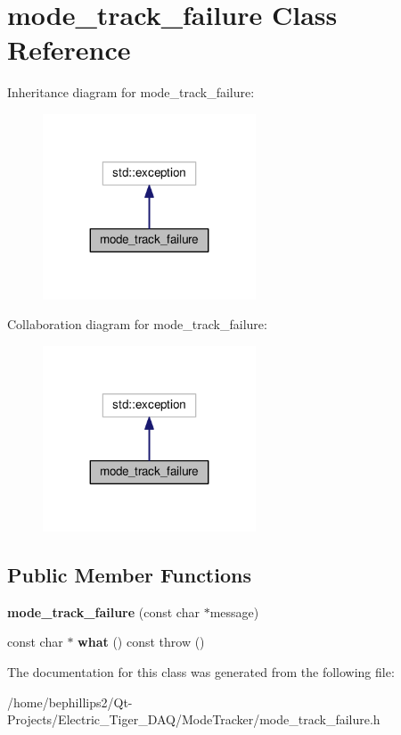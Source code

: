 \hypertarget{classmode__track__failure}{}\section{mode\+\_\+track\+\_\+failure Class Reference}
\label{classmode__track__failure}


Inheritance diagram for mode\+\_\+track\+\_\+failure\+:\nopagebreak
\begin{figure}[H]
\begin{center}
\leavevmode
\includegraphics[width=179pt]{classmode__track__failure__inherit__graph}
\end{center}
\end{figure}


Collaboration diagram for mode\+\_\+track\+\_\+failure\+:\nopagebreak
\begin{figure}[H]
\begin{center}
\leavevmode
\includegraphics[width=179pt]{classmode__track__failure__coll__graph}
\end{center}
\end{figure}
\subsection*{Public Member Functions}
\begin{DoxyCompactItemize}
\item 
{\bfseries mode\+\_\+track\+\_\+failure} (const char $\ast$message)\hypertarget{classmode__track__failure_a3636c3b5e513a98e420d7b769803fb07}{}\label{classmode__track__failure_a3636c3b5e513a98e420d7b769803fb07}

\item 
const char $\ast$ {\bfseries what} () const   throw ()\hypertarget{classmode__track__failure_a9a6a0afd0b4b1f675d5e3ab17313d937}{}\label{classmode__track__failure_a9a6a0afd0b4b1f675d5e3ab17313d937}

\end{DoxyCompactItemize}


The documentation for this class was generated from the following file\+:\begin{DoxyCompactItemize}
\item 
/home/bephillips2/\+Qt-\/\+Projects/\+Electric\+\_\+\+Tiger\+\_\+\+D\+A\+Q/\+Mode\+Tracker/mode\+\_\+track\+\_\+failure.\+h\end{DoxyCompactItemize}
